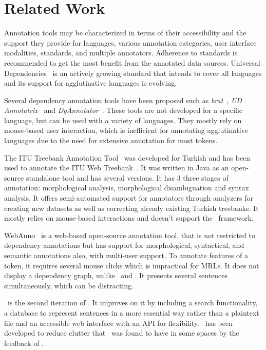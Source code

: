 \section{Related Work}
\label{sec:related}

Annotation tools may be characterized in terms of their accessibility and the support they provide for languages, various annotation categories, user interface modalities, standards, and multiple annotators.
Adherence to standards is recommended to get the most benefit from the annotated data sources.
Universal Dependencies~\cite{UD} is an actively growing standard that intends to cover all languages and its support for agglutinative languages is evolving.

Several dependency annotation tools have been proposed such as \textit{brat}~\cite{brat}, \textit{UD Annotatrix}~\cite{tyers-etal:2018} and \textit{DgAnnotator}~\cite{dgannotator,UD-tools}.
These tools are not developed for a specific language, but can be used with a variety of languages.
They mostly rely on mouse-based user interaction, which is inefficient for annotating agglutinative languages due to the need for extensive annotation for most tokens.

The ITU Treebank Annotation Tool~\cite{pamay-etal-2015-annotation} was developed for Turkish and has been used to annotate the ITU Web Treebank~\cite{itu-web-tb}.
It was written in Java as an open-source standalone tool and has several versions.
It has 3 three stages of annotation: morphological analysis, morphological disambiguation and syntax analysis.
It offers semi-automated support for annotators through analyzers for creating new datasets as well as correcting already existing Turkish treebanks.
It mostly relies on mouse-based interactions and doesn't support the \ud\ framework.

WebAnno~\cite{webanno} is a web-based open-source annotation tool, that is not restricted to dependency annotations but has support for morphological, syntactical, and semantic annotations also, with multi-user support.
To annotate features of a token, it requires several mouse clicks which is impractical for MRLs.
It does not display a dependency graph, unlike \boatvone\ and \boatvtwo.
It presents several sentences simultaneously, which can be distracting.

\boatvtwo\ is the second iteration of \boatvone.
It improves on it by including a search functionality, a database to represent sentences in a more essential way rather than a plaintext file and an accessible web interface with an API for flexibility.
\boatvtwo\ has been developed to reduce clutter that \boatvone\ was found to have in some spaces by the feedback of \boatvone.
